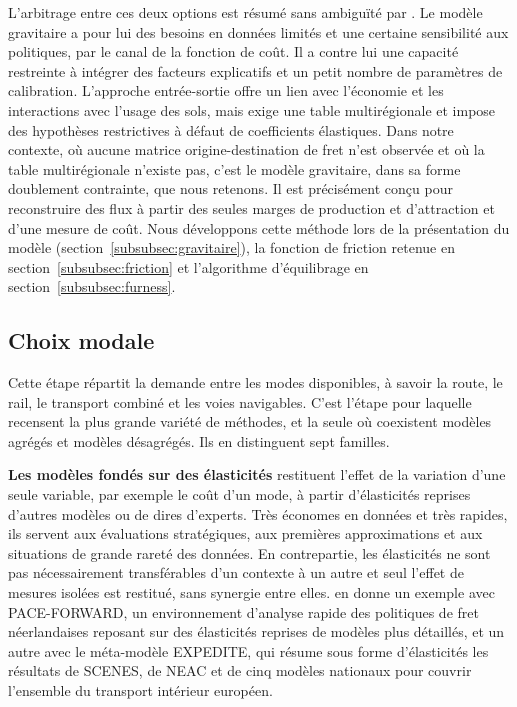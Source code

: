 \documentclass[12pt,a4paper,french]{report}
\begin{document}
	L'arbitrage entre ces deux options est résumé sans ambiguïté par \cite{deJong2004}. Le modèle gravitaire a pour lui des besoins en données limités et une certaine sensibilité aux politiques, par le canal de la fonction de coût. Il a contre lui une capacité restreinte à intégrer des facteurs explicatifs et un petit nombre de paramètres de calibration. L'approche entrée-sortie offre un lien avec l'économie et les interactions avec l'usage des sols, mais exige une table multirégionale et impose des hypothèses restrictives à défaut de coefficients élastiques. Dans notre contexte, où aucune matrice origine-destination de fret n'est observée et où la table multirégionale n'existe pas, c'est le modèle gravitaire, dans sa forme doublement contrainte, que nous retenons. Il est précisément conçu pour reconstruire des flux à partir des seules marges de production et d'attraction et d'une mesure de coût. Nous développons cette méthode lors de la présentation du modèle (section~\ref{subsubsec:gravitaire}), la fonction de friction retenue en section~\ref{subsubsec:friction} et l'algorithme d'équilibrage en section~\ref{subsubsec:furness}.

	\subsection{Choix modale}
	\label{subsec:choix_modale}

	Cette étape répartit la demande entre les modes disponibles, à savoir la route, le rail, le transport combiné et les voies navigables. C'est l'étape pour laquelle \cite{deJong2004} recensent la plus grande variété de méthodes, et la seule où coexistent modèles agrégés et modèles désagrégés. Ils en distinguent sept familles.

	\textbf{Les modèles fondés sur des élasticités} restituent l'effet de la variation d'une seule variable, par exemple le coût d'un mode, à partir d'élasticités reprises d'autres modèles ou de dires d'experts. Très économes en données et très rapides, ils servent aux évaluations stratégiques, aux premières approximations et aux situations de grande rareté des données. En contrepartie, les élasticités ne sont pas nécessairement transférables d'un contexte à un autre et seul l'effet de mesures isolées est restitué, sans synergie entre elles. \cite{Carrillo1996} en donne un exemple avec PACE-FORWARD, un environnement d'analyse rapide des politiques de fret néerlandaises reposant sur des élasticités reprises de modèles plus détaillés, et \cite{Expedite2002} un autre avec le méta-modèle EXPEDITE, qui résume sous forme d'élasticités les résultats de SCENES, de NEAC et de cinq modèles nationaux pour couvrir l'ensemble du transport intérieur européen. 
	
\end{document}
